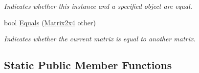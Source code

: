 \begin{DoxyCompactItemize}
\begin{DoxyCompactList}\small\item\em Indicates whether this instance and a specified object are equal. \end{DoxyCompactList}\item 
bool \hyperlink{struct_open_t_k_1_1_matrix2x4_a14b79e0343545cf38472470a13bce4ba}{Equals} (\hyperlink{struct_open_t_k_1_1_matrix2x4}{Matrix2x4} other)
\begin{DoxyCompactList}\small\item\em Indicates whether the current matrix is equal to another matrix. \end{DoxyCompactList}\end{DoxyCompactItemize}
\subsection*{Static Public Member Functions}
